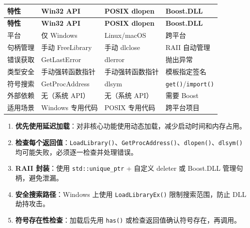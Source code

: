 \documentclass[12pt,a4paper,fontset=fandol]{ctexbook}
\newcommand{\Fn}[1]{\texttt{#1()}}
\begin{document}
\begin{tcolorbox}[compare={三种动态加载方式对比}]
\begin{longtable}{l>{\raggedright\arraybackslash}p{3.5cm}>{\raggedright\arraybackslash}p{3.5cm}>{\raggedright\arraybackslash}p{3.5cm}}
\toprule
\textbf{特性} & \textbf{Win32 API} & \textbf{POSIX dlopen} & \textbf{Boost.DLL} \\
\midrule
\endfirsthead
\toprule
\textbf{特性} & \textbf{Win32 API} & \textbf{POSIX dlopen} & \textbf{Boost.DLL} \\
\midrule
\endhead
平台          & 仅 Windows         & Linux/macOS         & 跨平台             \\
句柄管理      & 手动 FreeLibrary   & 手动 dlclose        & RAII 自动管理      \\
错误获取      & GetLastError       & dlerror             & 抛出异常           \\
类型安全      & 手动强转函数指针   & 手动强转函数指针    & 模板指定签名       \\
符号搜索      & GetProcAddress     & dlsym               & \Fn{get}/\allowbreak{}\Fn{import} \\
外部依赖      & 无（系统 API）     & 无（系统 API）      & 需要 Boost         \\
适用场景      & Windows 专用代码   & POSIX 专用代码      & 跨平台项目         \\
\bottomrule
\end{longtable}
\end{tcolorbox}

\begin{tcolorbox}[bestpractice={动态加载的最佳实践}]
\begin{enumerate}[nosep]
\item \textbf{优先使用延迟加载}：对非核心功能使用动态加载，减少启动时间和内存占用。
\item \textbf{检查每个返回值}：\Fn{LoadLibrary}、\Fn{GetProcAddress}、\Fn{dlopen}、\Fn{dlsym} 均可能失败，必须逐一检查并处理错误。
\item \textbf{RAII 封装}：使用 \texttt{std::unique\_ptr} + 自定义 deleter 或 Boost.DLL 管理句柄，避免泄漏。
\item \textbf{安全搜索路径}：Windows 上使用 \Fn{LoadLibraryEx} 限制搜索范围，防止 DLL 劫持攻击。
\item \textbf{符号存在性检查}：加载后先用 \Fn{has} 或检查返回值确认符号存在，再调用。
\end{enumerate}
\end{tcolorbox}
\end{document}
